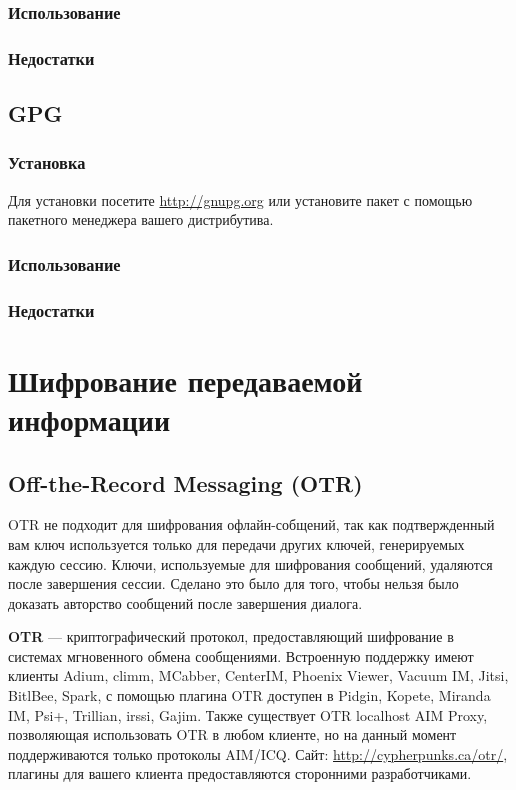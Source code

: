 \subsubsection{Использование}
\subsubsection{Недостатки}
\subsection{GPG}
\subsubsection{Установка}
Для установки посетите \url{http://gnupg.org} или установите пакет с помощью пакетного менеджера вашего дистрибутива.
\subsubsection{Использование}
\subsubsection{Недостатки}

\section{Шифрование передаваемой информации}
\subsection{Off-the-Record Messaging (OTR)}
\begin{important}
OTR не подходит для шифрования офлайн-собщений, так как подтвержденный вам ключ используется только для передачи других ключей, генерируемых каждую сессию. Ключи, используемые для шифрования сообщений, удаляются после завершения сессии. Сделано это было для того, чтобы нельзя было доказать авторство сообщений после завершения диалога.
\end{important}
\textbf{OTR} --- криптографический протокол, предоставляющий шифрование в системах мгновенного обмена сообщениями. Встроенную поддержку имеют клиенты Adium, climm, MCabber, CenterIM, Phoenix Viewer, Vacuum IM, Jitsi, BitlBee, Spark, с помощью плагина OTR доступен в Pidgin\cite{otr-pidgin}, Kopete\cite{otr-kopete}, Miranda IM\cite{otr-miranda}, Psi+\cite{otr-psi}, Trillian\cite{otr-trillian}, irssi\cite{otr-irssi}, Gajim\cite{otr-gajim}. Также существует OTR localhost AIM Proxy, позволяющая использовать OTR в любом клиенте, но на данный момент поддерживаются только протоколы AIM/ICQ. Сайт: \url{http://cypherpunks.ca/otr/}, плагины для вашего клиента предоставляются сторонними разработчиками.
